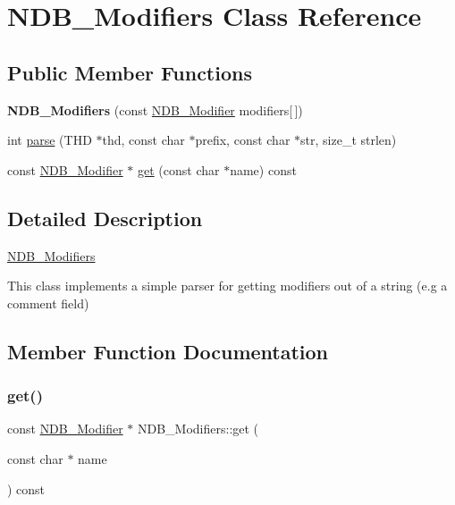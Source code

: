 \hypertarget{classNDB__Modifiers}{}\section{N\+D\+B\+\_\+\+Modifiers Class Reference}
\label{classNDB__Modifiers}
\subsection*{Public Member Functions}
\begin{DoxyCompactItemize}
\item 
\mbox{\label{classNDB__Modifiers_a352016470e97192dbc1825d41890d4f3}} 
{\bfseries N\+D\+B\+\_\+\+Modifiers} (const \mbox{\hyperlink{structNDB__Modifier}{N\+D\+B\+\_\+\+Modifier}} modifiers\mbox{[}$\,$\mbox{]})
\item 
int \mbox{\hyperlink{classNDB__Modifiers_a02f4af022d96e7bf5e25d79467bba423}{parse}} (T\+HD $\ast$thd, const char $\ast$prefix, const char $\ast$str, size\+\_\+t strlen)
\item 
const \mbox{\hyperlink{structNDB__Modifier}{N\+D\+B\+\_\+\+Modifier}} $\ast$ \mbox{\hyperlink{classNDB__Modifiers_aa1774857d383249eec23b50cc035a968}{get}} (const char $\ast$name) const
\end{DoxyCompactItemize}


\subsection{Detailed Description}
\mbox{\hyperlink{classNDB__Modifiers}{N\+D\+B\+\_\+\+Modifiers}}

This class implements a simple parser for getting modifiers out of a string (e.\+g a comment field) 

\subsection{Member Function Documentation}
\mbox{\label{classNDB__Modifiers_aa1774857d383249eec23b50cc035a968}} 
\subsubsection{\texorpdfstring{get()}{get()}}
{\footnotesize\ttfamily const \mbox{\hyperlink{structNDB__Modifier}{N\+D\+B\+\_\+\+Modifier}} $\ast$ N\+D\+B\+\_\+\+Modifiers\+::get (\begin{DoxyParamCaption}\item[{const char $\ast$}]{name }\end{DoxyParamCaption}) const}

